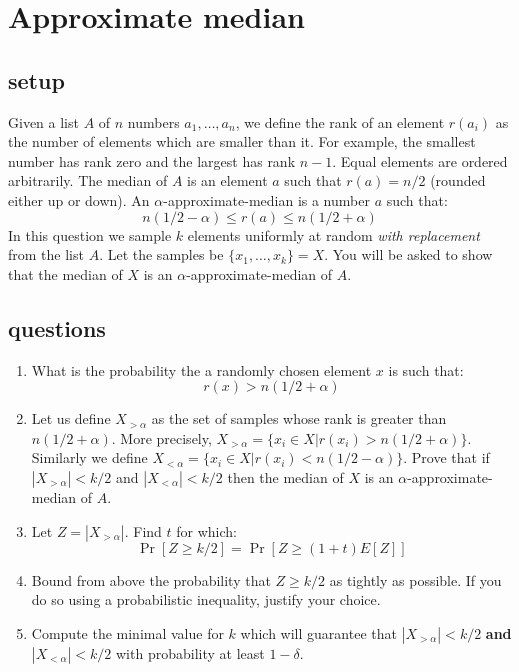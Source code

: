 \documentclass{article}
\begin{document}

\section{Approximate median}
\subsection*{setup}
Given a list $A$ of $n$ numbers $a_1,\ldots,a_n$, we define the rank
of an element $r(a_i)$ as the number of elements which are smaller
than it. For example, the smallest number has rank zero and the
largest has rank $n-1$. Equal elements are ordered arbitrarily. The
median of $A$ is an element $a$ such that $r(a) = n/2$ (rounded
either up or down). An $\alpha$-approximate-median is a number $a$
such that:
\[
n(1/2 - \alpha) \le r(a) \le n(1/2 + \alpha)
\]
In this question we sample $k$ elements uniformly at random {\it
with replacement} from the list $A$. Let the samples be
$\{x_1,\ldots,x_k\} = X$. You will be asked to show that the median of
$X$ is an $\alpha$-approximate-median of $A$.

\subsection*{questions}
\begin{enumerate}
\item What is the probability the a randomly chosen element $x$ is
such that:
\[
r(x) > n(1/2 + \alpha)
\]
\item Let us define $X_{>\alpha}$ as the set of samples whose rank
is greater than $n(1/2 + \alpha)$. More precisely, $X_{>\alpha} =
\{x_i \in X | r(x_i) > n(1/2 + \alpha)\}$. Similarly we define
$X_{<\alpha} = \{x_i \in X | r(x_i) < n(1/2 - \alpha)\}$. Prove that
if $|X_{>\alpha}| < k/2$ and $|X_{<\alpha}| < k/2$ then the median
of $X$ is an $\alpha$-approximate-median of $A$.
\item Let $Z = |X_{>\alpha}|$. Find $t$ for which:
\[
\Pr[Z \ge k/2] = \Pr[Z \ge (1+t)E[Z]]
\]
\item Bound from above the probability that $Z \ge k/2$ as tightly
as possible. If you do so using a probabilistic inequality, justify
your choice.
\item Compute the minimal value for $k$ which will guarantee that
$|X_{>\alpha}| < k/2$ {\bf and} $|X_{<\alpha}| < k/2$ with
probability at least $1-\delta$.
\end{enumerate}
\pagebreak
\end{document}
